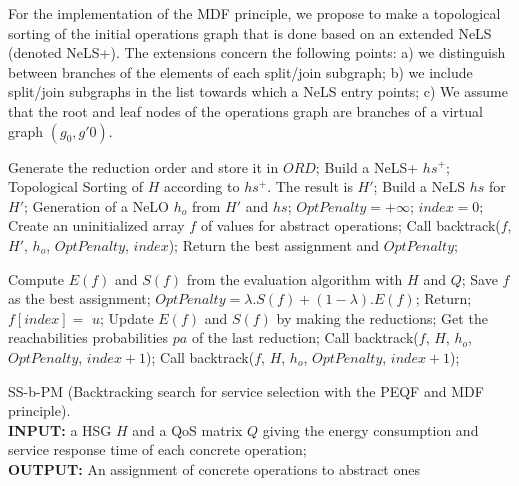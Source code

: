 \documentclass[a4paper]{article}
\begin{document}
For the implementation of the MDF principle, we propose to make a topological sorting of the initial operations 
graph that is done based on an extended NeLS (denoted NeLS+). The extensions concern the following points: a) we distinguish between 
branches of the elements of each split/join subgraph; b) we include split/join subgraphs in the list towards which 
a NeLS entry points; c) We assume that the root and leaf nodes of the operations graph are branches of a 
virtual graph $(g_0, g'0)$.

\begin{algorithm}[H]                    
\begin{algorithmic}[1]
\scriptsize
{}
	\State Generate the reduction order and store it in $ORD$;
	\State Build a NeLS+ $hs^+$;
	\State Topological Sorting of $H$ according to $hs^+$. The result is $H'$;
	\State Build a NeLS $hs$ for $H'$;
	\State Generation of a NeLO $h_o$ from $H'$ and $hs$;
        \State $OptPenalty = +\infty$;  $index = 0$;
	\State Create an uninitialized array $f$ of values for abstract operations;
	\State Call backtrack($f$, $H'$, $h_o$, $OptPenalty$, $index$);
	\State Return the best assignment and $OptPenalty$;
\EndFunction

	\State Compute $E(f)$ and $S(f)$ from the evaluation algorithm with $H$ and $Q$;
			\State Save $f$ as the best assignment;
			\State $OptPenalty = \lambda.S(f) + (1-\lambda).E(f)$;
		\EndIf
	\EndIf
	\State Return;
\EndIf
{}
\State $f[index] =$ $u$;
\State  Update $E(f)$ and $S(f)$ by making the reductions;
\State Get the reachabilities probabilities $pa$ of the last reduction;
\State Call backtrack($f$, $H$, $h_o$, $OptPenalty$,  $index+1$);
\EndIf
\EndIf
\Else
\State Call backtrack($f$, $H$, $h_o$, $OptPenalty$,  $index+1$);
\EndIf
\EndFor
\EndFunction

\normalsize
\end{algorithmic}
\caption{\scriptsize SS-b-PM (Backtracking search for service selection with the PEQF and MDF principle). \\ {\bf INPUT:} a HSG $H$ and a QoS matrix $Q$ giving the energy consumption and service response time of each concrete operation;  \\ {\bf OUTPUT:} An assignment of concrete operations to abstract ones }
\label{alg:Backtracking}  
\end{algorithm}
\end{document}
